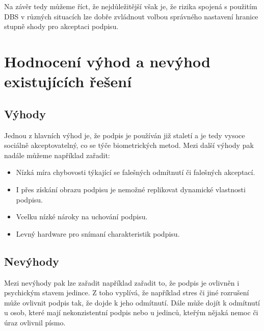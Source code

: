 Na závěr tedy můžeme říct, že nejdůležitější však je, že rizika spojená s použitím DBS v různých situacích lze dobře 
zvládnout volbou správného nastavení hranice stupně shody pro akceptaci podpisu. %

\section{Hodnocení výhod a nevýhod existujících řešení}
\subsection*{Výhody}
Jednou z hlavních výhod je, že podpis je používán již staletí a je tedy vysoce sociálně akceptovatelný, co se týče biometrických metod.
Mezi další výhody pak nadále můžeme například zařadit:

\begin{itemize}
  \item Nízká míra chybovosti týkající se falešných odmítnutí či falešných akceptací.
  \item I přes získání obrazu podpisu je nemožné replikovat dynamické vlastnosti podpisu.
  \item Vcelku nízké nároky na uchování podpisu.
  \item Levný hardware pro snímaní charakteristik podpisu.
\end{itemize}

\subsection*{Nevýhody}
Mezi nevýhody pak lze zařadit například zařadit to, že podpis je ovlivněn i psychickým stavem jedince.
Z toho vyplívá, že například stres či jiné rozrušení může ovlivnit podpis tak, že dojde k jeho odmítnutí.
Dále může dojít k odmítnutí u osob, které mají nekonzistentní podpis nebo u jedinců, kteřým nějaká nemoc či úraz ovlivnil písmo.



